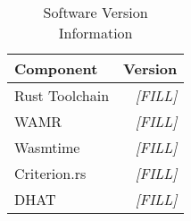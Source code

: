 \begin{table}[htbp]
\centering
\caption{Software Version Information}
\label{tab:software-versions}
\begin{tabular}{lr}
\toprule
\textbf{Component} & \textbf{Version} \\
\midrule
Rust Toolchain     & \textit{[FILL]} \\
WAMR               & \textit{[FILL]} \\
Wasmtime           & \textit{[FILL]} \\
Criterion.rs       & \textit{[FILL]} \\
DHAT               & \textit{[FILL]} \\
\bottomrule
\end{tabular}
\end{table}